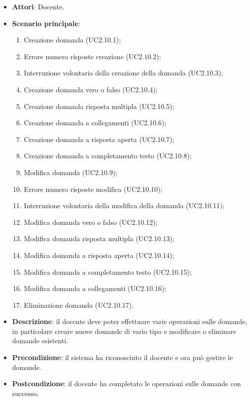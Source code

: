 \begin{itemize}
\item \textbf{Attori}: Docente.
\item \textbf{Scenario principale}:
\begin{enumerate}
\item Creazione domanda (UC2.10.1);
\item Errore numero risposte creazione (UC2.10.2);
\item Interruzione volontaria della creazione della domanda (UC2.10.3);
\item Creazione domanda vero o falso (UC2.10.4);
\item Creazione domanda risposta multipla (UC2.10.5);
\item Creazione domanda a collegamenti (UC2.10.6);
\item Creazione domanda a risposta aperta (UC2.10.7);
\item Creazione domanda a completamento testo (UC2.10.8);
\item Modifica domanda (UC2.10.9);
\item Errore numero risposte modifica (UC2.10.10);
\item Interruzione volontaria della modifica della domanda (UC2.10.11);
\item Modifica domanda vero o falso (UC2.10.12);
\item Modifica domanda risposta multipla (UC2.10.13);
\item Modifica domanda a risposta aperta (UC2.10.14);
\item Modifica domanda a completamento testo (UC2.10.15);
\item Modifica domanda a collegamenti (UC2.10.16);
\item Eliminazione domanda (UC2.10.17).
\end{enumerate}
\item \textbf{Descrizione}: il docente deve poter effettuare varie operazioni sulle domande, in particolare creare nuove domande di vario tipo e modificare o eliminare domande esistenti.
\item \textbf{Precondizione}: il sistema ha riconosciuto il docente e ora può gestire le domande.
\item \textbf{Postcondizione}: il docente ha completato le operazioni sulle domande con successo.
\end{itemize}
